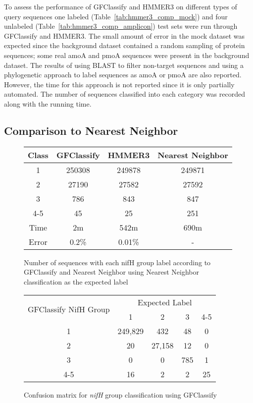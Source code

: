 \documentclass{article}
\begin{document}
To assess the performance of GFClassify and HMMER3 on different types of query sequences one labeled (Table~\ref{tab:hmmer3_comp_mock}) and four unlabeled (Table~\ref{tab:hmmer3_comp_amplicon}) test sets were run through GFClassify and HMMER3.  The small amount of error in the mock dataset was expected since the background dataset contained a random sampling of protein sequences; some real amoA and pmoA sequences were present in the background dataset.  The results of using BLAST to filter non-target sequences and using a phylogenetic approach to label sequences as amoA or pmoA are also reported.  However, the time for this approach is not reported since it is only partially automated.  The number of sequences classified into each category was recorded along with the running time.

\subsection{Comparison to Nearest Neighbor}
\begin{figure}
  \center
  \begin{tabular}{cccc}
    \hline
    Class & GFClassify & HMMER3 & Nearest Neighbor \\
    \hline
    1 & 250308 & 249878 & 249871 \\
    2 & 27190 & 27582 & 27592 \\
    3 & 786 & 843 & 847 \\
    4-5 & 45 & 25 & 251 \\
    \hline
    Time  & 2m & 542m & 690m \\
    Error & 0.2\% & 0.01\% & - \\
    \hline
  \end{tabular}
  \caption{Number of sequences with each nifH group label according to GFClassify and Nearest Neighbor using Nearest Neighbor classification as the expected label}
  \label{tab:gfclassify_nn_comp}
\end{figure}

\begin{figure}
  \center
  \begin{tabular}{|c|cccc|}
    \hline
    \multirow{2}{*}{GFClassify NifH Group} & \multicolumn{4}{c|}{Expected Label} \\
    & 1 & 2 & 3 & 4-5 \\
    \hline
    1   & 249,829 & 432    & 48  & 0 \\
    2   & 20      & 27,158 & 12  & 0 \\
    3   & 0       & 0      & 785 & 1 \\
    4-5 & 16      & 2      & 2   & 25 \\
    \hline
  \end{tabular}
  \caption{Confusion matrix for \emph{nifH} group classification using GFClassify}
  \label{tab:gfclassify_nn_label_diff}
\end{figure}
\end{document}
